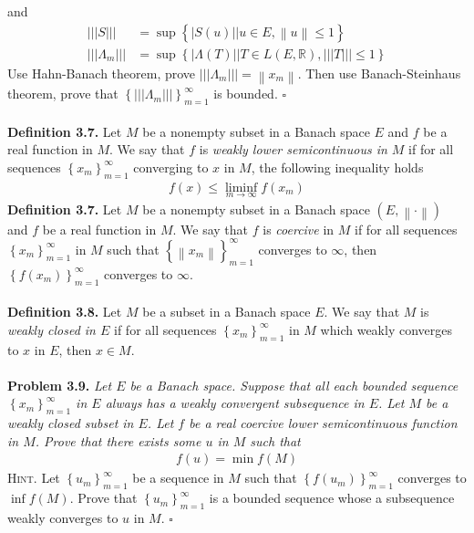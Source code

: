 \documentclass[a4paper]{article}
\numberwithin{equation}{section}
\begin{document}
and
\begin{align}
|||S||| &= \sup \left\{ {\left| {S\left( u \right)} \right||u \in E,\left\| u \right\| \le 1} \right\}\\
|||{\Lambda _m}||| &= \sup \left\{ {\left| {\Lambda \left( T \right)} \right||T \in L\left( {E,\mathbb{R}} \right),|||T||| \le 1} \right\}
\end{align}
Use Hahn-Banach theorem, prove $|||{\Lambda _m}||| = \left\| {{x_m}} \right\|$. Then use Banach-Steinhaus theorem, prove that $\left\{ {|||{\Lambda _m}|||} \right\}_{m = 1}^\infty $ is bounded. \hfill $\square$\\
\\
\textbf{Definition 3.7.} Let $M$ be a nonempty subset in a Banach space $E$ and $f$ be a real function in $M$. We say that $f$ is \textit{weakly lower semicontinuous in $M$} if for all sequences $\left\{ {{x_m}} \right\}_{m = 1}^\infty $ converging to $x$ in $M$, the following inequality holds
\begin{align}
f\left( x \right) \le \mathop {\lim \inf }\limits_{m \to \infty } f\left( {{x_m}} \right)
\end{align}
\textbf{Definition 3.7.} Let $M$ be a nonempty subset in a Banach space $\left( {E,\left\|  \cdot  \right\|} \right)$ and $f$ be a real function in $M$. We say that $f$ is \textit{coercive} in $M$ if for all sequences $\left\{ {{x_m}} \right\}_{m = 1}^\infty $ in $M$ such that $\left\{ {\left\| {{x_m}} \right\|} \right\}_{m = 1}^\infty $ converges to $\infty$, then $\left\{ {f\left( {{x_m}} \right)} \right\}_{m = 1}^\infty $ converges to $\infty$.\\
\\
\textbf{Definition 3.8.} Let $M$ be a subset in a Banach space $E$. We say that $M$ is \textit{weakly closed in $E$} if for all sequences $\left\{ {{x_m}} \right\}_{m = 1}^\infty $ in $M$ which weakly converges to $x$ in $E$, then $x \in M$.\\
\\
\textbf{Problem 3.9.} \textit{Let $E$ be a Banach space. Suppose that all each bounded sequence $\left\{ {{x_m}} \right\}_{m = 1}^\infty $ in $E$ always has a weakly convergent subsequence in $E$. Let $M$ be a weakly closed subset in $E$. Let $f$ be a real coercive lower semicontinuous function in $M$. Prove that there exists some $u$ in $M$ such that}
\begin{align}
f\left( u \right) = \min f\left( M \right)
\end{align}
\textsc{Hint.} Let $\left\{ {{u_m}} \right\}_{m = 1}^\infty $ be a sequence in $M$ such that $\left\{ {f\left( {{u_m}} \right)} \right\}_{m = 1}^\infty $ converges to $\inf f\left( M \right)$. Prove that $\left\{ {{u_m}} \right\}_{m = 1}^\infty $ is a bounded sequence whose a subsequence weakly converges to $u$ in $M$. \hfill $\square$\\
\end{document}
